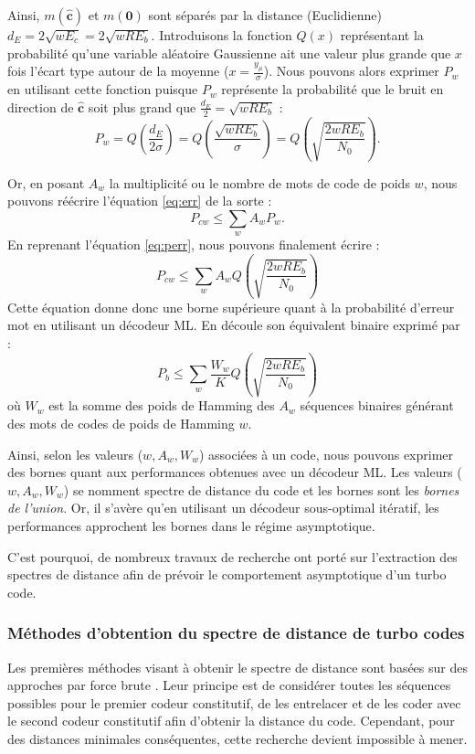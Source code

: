 Ainsi, $m(\mathbf{\hat{c}})$ et $m(\mathbf{0})$ sont séparés par la distance (Euclidienne) $d_E = 2\sqrt{wE_c} = 2\sqrt{wRE_b}$. Introduisons la fonction $Q(x)$ représentant la probabilité qu'une variable aléatoire Gaussienne ait une valeur plus grande que $x$ fois l'écart type autour de la moyenne ($x=\frac{y_\mu}{\sigma}$). Nous pouvons alors exprimer $P_w$ en utilisant cette fonction puisque $P_w$ représente la probabilité que le bruit en direction de $\mathbf{\hat{c}}$ soit plus grand que $\frac{d_E}{2} = \sqrt{wRE_b}$ : 
\begin{equation}\label{eq:perr}
	P_w = Q\left(\frac{d_E}{2\sigma}\right) = Q\left(\frac{\sqrt{wRE_b}}{\sigma}\right) = Q\left(\sqrt{\frac{2wRE_b}{N_0}}\right).  
\end{equation} 

Or, en posant $A_w$ la multiplicité ou le nombre de mots de code de poids $w$, nous pouvons réécrire l'équation \ref{eq:err} de la sorte : 
\[P_{cw} \le \sum\limits_w A_wP_w.\]
En reprenant l'équation \ref{eq:perr}, nous pouvons finalement écrire :
\begin{equation} \label{eq:uboundfer}
	P_{cw} \le \sum\limits_w A_w Q\left(\sqrt{\frac{2wRE_b}{N_0}}\right)
\end{equation}
Cette équation donne donc une borne supérieure quant à la probabilité d'erreur mot en utilisant un décodeur ML. En découle son équivalent binaire exprimé par :
\begin{equation} \label{eq:uboundfer}
	P_{b} \le \sum\limits_w \frac{W_w}{K} Q\left(\sqrt{\frac{2wRE_b}{N_0}}\right)
\end{equation} 
où $W_w$ est la somme des poids de Hamming des $A_w$ séquences binaires générant  des mots de codes de poids de Hamming $w$.
	
Ainsi, selon les valeurs ($w,A_w,W_w$) associées à un code, nous pouvons exprimer des bornes quant aux performances obtenues avec un décodeur ML. Les valeurs ($w,A_w,W_w$) se nomment spectre de distance du code et les bornes sont les \emph{bornes de l'union}. Or, il s'avère qu'en utilisant un décodeur sous-optimal itératif, les performances approchent les bornes dans le régime asymptotique.
	
C'est pourquoi, de nombreux travaux de recherche ont porté sur l'extraction des spectres de distance afin de prévoir le comportement asymptotique d'un turbo code.
	
\subsubsection{Méthodes d'obtention du spectre de distance de turbo codes}\label{seq:spectre}
Les premières méthodes visant à obtenir le spectre de distance sont basées sur des approches par force brute \cite{illuminating}. Leur principe est de considérer toutes les séquences possibles pour le premier codeur constitutif, de les entrelacer et de les coder avec le second codeur constitutif afin d'obtenir la distance du code. Cependant, pour des distances minimales conséquentes, cette recherche devient impossible à mener.
	
